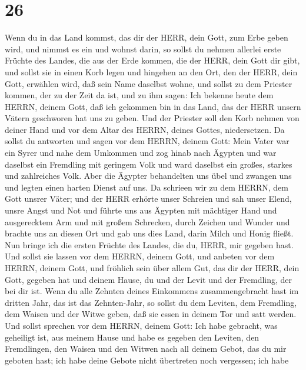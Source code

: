 \hypertarget{section-25}{%
\section{26}\label{section-25}}

 Wenn du in das Land kommst, das dir der HERR, dein Gott,
zum Erbe geben wird, und nimmst es ein und wohnst darin,  so
sollst du nehmen allerlei erste Früchte des Landes, die aus der Erde
kommen, die der HERR, dein Gott dir gibt, und sollst sie in einen Korb
legen und hingehen an den Ort, den der HERR, dein Gott, erwählen wird,
daß sein Name daselbst wohne,  und sollst zu dem Priester
kommen, der zu der Zeit da ist, und zu ihm sagen: Ich bekenne heute dem
HERRN, deinem Gott, daß ich gekommen bin in das Land, das der HERR
unsern Vätern geschworen hat uns zu geben.  Und der Priester
soll den Korb nehmen von deiner Hand und vor dem Altar des HERRN, deines
Gottes, niedersetzen.  Da sollst du antworten und sagen vor
dem HERRN, deinem Gott: Mein Vater war ein Syrer und nahe dem Umkommen
und zog hinab nach Ägypten und war daselbst ein Fremdling mit geringem
Volk und ward daselbst ein großes, starkes und zahlreiches Volk.
 Aber die Ägypter behandelten uns übel und zwangen uns und
legten einen harten Dienst auf uns.  Da schrieen wir zu dem
HERRN, dem Gott unsrer Väter; und der HERR erhörte unser Schreien und
sah unser Elend, unsre Angst und Not  und führte uns aus
Ägypten mit mächtiger Hand und ausgerecktem Arm und mit großem
Schrecken, durch Zeichen und Wunder  und brachte uns an
diesen Ort und gab uns dies Land, darin Milch und Honig fließt.
 Nun bringe ich die ersten Früchte des Landes, die du,
HERR, mir gegeben hast. Und sollst sie lassen vor dem HERRN, deinem
Gott, und anbeten vor dem HERRN, deinem Gott,  und fröhlich
sein über allem Gut, das dir der HERR, dein Gott, gegeben hat und deinem
Hause, du und der Levit und der Fremdling, der bei dir ist.
 Wenn du alle Zehnten deines Einkommens zusammengebracht
hast im dritten Jahr, das ist das Zehnten-Jahr, so sollst du dem
Leviten, dem Fremdling, dem Waisen und der Witwe geben, daß sie essen in
deinem Tor und satt werden.  Und sollst sprechen vor dem
HERRN, deinem Gott: Ich habe gebracht, was geheiligt ist, aus meinem
Hause und habe es gegeben den Leviten, den Fremdlingen, den Waisen und
den Witwen nach all deinem Gebot, das du mir geboten hast; ich habe
deine Gebote nicht übertreten noch vergessen;  ich habe
